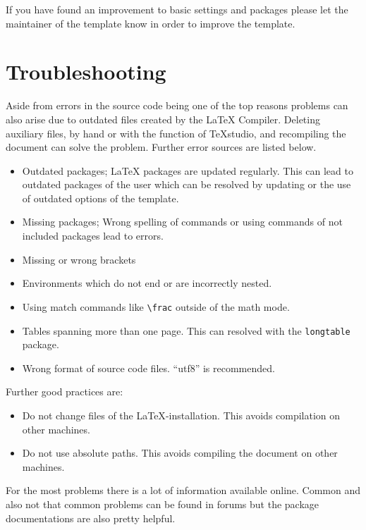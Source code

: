 	If you have found an improvement to basic settings and packages please let the maintainer of the template know in order to improve the template.

\section{Troubleshooting}
\label{sec:troubleshooting}

	Aside from errors in the source code being one of the top reasons problems can also arise due to outdated files created by the {\LaTeX} Compiler. Deleting auxiliary files, by hand or with the function of TeXstudio, and recompiling the document can solve the problem. Further error sources are listed below.
	
	\begin{itemize}
		\item Outdated packages; {\LaTeX} packages are updated regularly. This can lead to outdated packages of the user which can be resolved by updating or the use of outdated options of the template.
		\item Missing packages; Wrong spelling of commands or using commands of not included packages lead to errors.
		\item Missing or wrong brackets
		\item Environments which do not end or are incorrectly nested.
		\item Using match commands like \verb|\frac| outside of the math mode.
		\item Tables spanning more than one page. This can resolved with the \texttt{longtable} package.
		\item Wrong format of source code files. \enquote{utf8} is recommended.
	\end{itemize}

	Further good practices are:
	\begin{itemize}
		\item Do not change files of the {\LaTeX}-installation. This avoids compilation on other machines.
		\item Do not use absolute paths. This avoids compiling the document on other machines.
	\end{itemize}

	For the most problems there is a lot of information available online. Common and also not that common problems can be found in forums but the package documentations are also pretty helpful.
